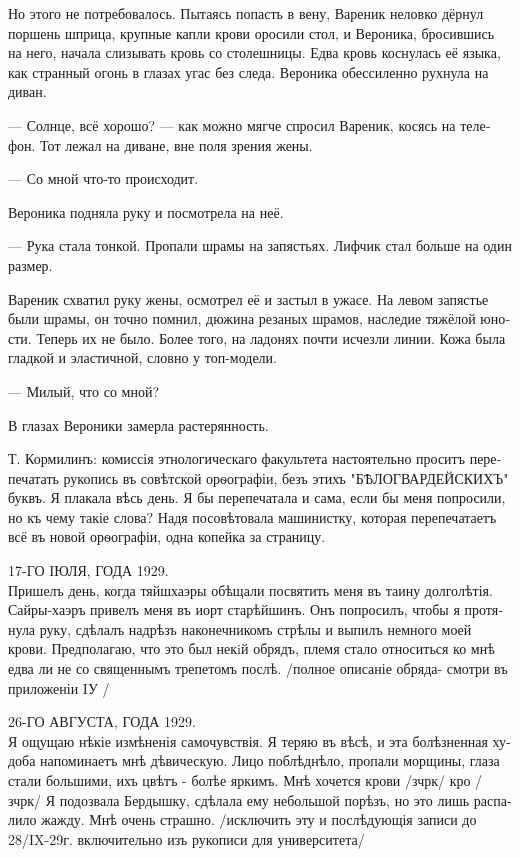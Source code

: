 \documentclass[a5paper,12pt,fleqn]{extbook}\usepackage{cooltooltips}\usepackage{polyglossia}\setdefaultlanguage[babelshorthands=true]{russian}\setotherlanguage{english}\defaultfontfeatures{Ligatures=TeX,Mapping=tex-text} \usepackage{xcolor}\definecolor{lightgray}{HTML}{bbbbbb}\color{lightgray}\newcommand{\ml}[3]{\textenglish{\textcolor{black}{#3}}}
\newcommand{\asterism}{\vspace{1em}{\centering\Large\bfseries$\ast~\ast~\ast$\par}\vspace{1em}}
\newcommand{\textspace}{\vspace{1em}{\centering\Large\bfseries<...>\par}\vspace{1em}}
\newcommand{\oldtyping}[1]{{\hspace{0.1em}\oldfont\small{#1}\par}\hspace{0.1em}}
\begin{document}
Но этого не потребовалось.
Пытаясь попасть в вену, Вареник неловко дёрнул поршень шприца, крупные капли крови оросили стол, и Вероника, бросившись на него, начала слизывать кровь со столешницы.
Едва кровь коснулась её языка, как странный огонь в глазах угас без следа.
Вероника обессиленно рухнула на диван.

--- Солнце, всё хорошо? --- как можно мягче спросил Вареник, косясь на телефон.
Тот лежал на диване, вне поля зрения жены.

--- Со мной что-то происходит.

Вероника подняла руку и посмотрела на неё.

--- Рука стала тонкой.
Пропали шрамы на запястьях.
Лифчик стал больше на один размер.

Вареник схватил руку жены, осмотрел её и застыл в ужасе.
На левом запястье были шрамы, он точно помнил, дюжина резаных шрамов, наследие тяжёлой юности.
Теперь их не было.
Более того, на ладонях почти исчезли линии.
Кожа была гладкой и эластичной, словно у топ-модели.

--- Милый, что со мной?

В глазах Вероники замерла растерянность.

\asterism

\textspace


\oldtyping{
Т. ​Кормилинъ​: комиссія этнологическаго факультета настоятельно проситъ перепечатать рукопись въ совѣтской орѳографіи, безъ этихъ "БѢЛОГВАРДЕЙСКИХЪ" буквъ.
Я плакала ​вѣсь​ день.
Я бы перепечатала и сама, если бы меня попросили, но къ чему такіе слова?
Надя посовѣтовала машинистку, которая перепечатаетъ всё въ новой орѳографіи, одна копейка за страницу.
}

\oldtyping{
17-ГО IЮЛЯ, ГОДА 1929.\\
Пришелъ день, когда тяйшхаэры обѣщали посвятить меня въ таину долголѣтія.
Сайры-хаэръ привелъ меня въ иорт старѣйшинъ.
Онъ попросилъ, чтобы я протянула руку, сдѣлалъ надрѣзъ наконечникомъ стрѣлы и выпилъ немного моей крови.
Предполагаю, что это был некiй обрядъ, племя стало относиться ко мнѣ едва ли не со священнымъ трепетомъ послѣ.
/полное описаніе обряда- смотри въ приложеніи IУ /
}

\oldtyping{
26-ГО АВГУСТА, ГОДА 1929.\\
Я ощущаю нѣкіе измѣненія самочувствія.
Я теряю въ вѣсѣ, и эта болѣзненная худоба напоминаетъ мнѣ дѣвическую.
Лицо поблѣднѣло, пропали морщины, глаза стали большими, ихъ цвѣтъ - болѣе яркимъ.
Мнѣ хочется крови /зчрк/ кро /зчрк/
Я подозвала Бердышку, сдѣлала ему небольшой порѣзъ, но это лишь распалило жажду.
Мнѣ очень страшно.
/исключить эту и послѣдующія записи до 28/IX-29г. включительно изъ рукописи для университета/
}
\end{document}
